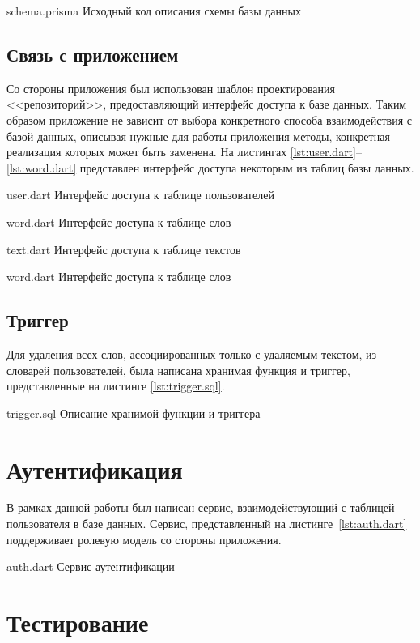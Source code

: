     {schema.prisma}
    {Исходный код описания схемы базы данных}

\subsection{Связь с приложением}

Со стороны приложения был использован шаблон проектирования <<репозиторий>>, предоставляющий интерфейс доступа к базе данных. Таким образом приложение не зависит от выбора конкретного способа взаимодействия с базой данных, описывая нужные для работы приложения методы, конкретная реализация которых может быть заменена. На листингах \ref{lst:user.dart}--\ref{lst:word.dart} представлен интерфейс доступа некоторым из таблиц базы данных.

    {user.dart}
    {Интерфейс доступа к таблице пользователей}

    {word.dart}
    {Интерфейс доступа к таблице слов}

    {text.dart}
    {Интерфейс доступа к таблице текстов}

    {word.dart}
    {Интерфейс доступа к таблице слов}

\clearpage

\subsection{Триггер}

Для удаления всех слов, ассоциированных только с удаляемым текстом, из словарей пользователей, была написана хранимая функция и триггер, представленные на листинге \ref{lst:trigger.sql}.

    {trigger.sql}
    {Описание хранимой функции и триггера}

\clearpage

\section{Аутентификация}

В рамках данной работы был написан сервис, взаимодействующий с таблицей пользователя в базе данных. Сервис, представленный на листинге~\ref{lst:auth.dart} поддерживает ролевую модель со стороны приложения.

    {auth.dart}
    {Сервис аутентификации}

\clearpage

\section{Тестирование}

